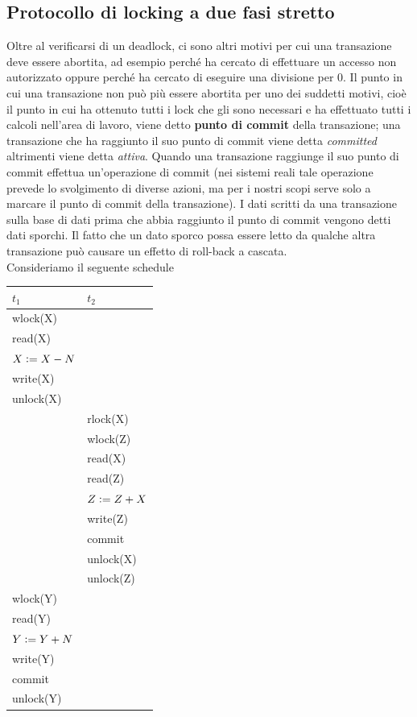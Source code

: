 \subsection{Protocollo di locking a due fasi stretto}
Oltre al verificarsi di un deadlock, ci sono altri motivi per cui una transazione deve essere abortita,
ad esempio perché ha cercato di effettuare un accesso non autorizzato oppure perché ha cercato di
eseguire una divisione per 0. Il punto in cui una transazione non può più essere abortita per uno dei
suddetti motivi, cioè il punto in cui ha ottenuto tutti i lock che gli sono necessari e ha effettuato tutti
i calcoli nell'area di lavoro, viene detto \textbf{punto di commit} della transazione; una transazione che ha
raggiunto il suo punto di commit viene detta \emph{committed} altrimenti viene detta \emph{attiva}. Quando una
transazione raggiunge il suo punto di commit effettua un'operazione di commit (nei sistemi reali
tale operazione prevede lo svolgimento di diverse azioni, ma per i nostri scopi serve solo a marcare
il punto di commit della transazione). I dati scritti da una transazione sulla base di dati prima che
abbia raggiunto il punto di commit vengono detti dati sporchi. Il fatto che un dato sporco possa
essere letto da qualche altra transazione può causare un effetto di roll-back a cascata.\\

Consideriamo il seguente schedule
\begin{center}
 \begin{longtable}{|l|l|}
 \hline
 $t_1$ & $t_2$\\
 \hline
wlock(X) & \\
read(X)& \\
$X\vcentcolon=X-N$& \\
write(X)& \\
unlock(X)& \\
 &rlock(X)\\
 &wlock(Z)\\
 &read(X)\\
 &read(Z)\\
 &$Z\vcentcolon=Z+X$\\
 &write(Z)\\
 &commit\\
 &unlock(X)\\
 &unlock(Z)\\
 wlock(Y)& \\
 read(Y)& \\
 $Y\vcentcolon=Y+N$& \\
 write(Y)& \\
 commit& \\
 unlock(Y)& \\
 \hline
 \end{longtable}
\end{center}

